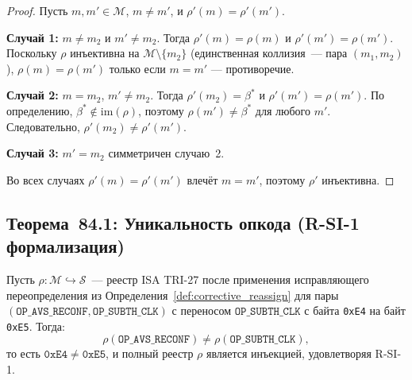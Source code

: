 \begin{proof}
Пусть $m, m' \in \mathcal{M}$, $m \neq m'$, и $\rho'(m) = \rho'(m')$.

\medskip
\noindent\textbf{Случай 1:} $m \neq m_2$ и $m' \neq m_2$.
Тогда $\rho'(m) = \rho(m)$ и $\rho'(m') = \rho(m')$.
Поскольку $\rho$ инъективна на $\mathcal{M} \setminus \{m_2\}$
(единственная коллизия~— пара $(m_1, m_2)$),
$\rho(m) = \rho(m')$ только если $m = m'$ — противоречие.

\medskip
\noindent\textbf{Случай 2:} $m = m_2$, $m' \neq m_2$.
Тогда $\rho'(m_2) = \beta^*$ и $\rho'(m') = \rho(m')$.
По определению, $\beta^* \notin \mathrm{im}(\rho)$,
поэтому $\rho(m') \neq \beta^*$ для любого $m'$.
Следовательно, $\rho'(m_2) \neq \rho'(m')$.

\medskip
\noindent\textbf{Случай 3:} $m' = m_2$ симметричен случаю~2.

\medskip
Во всех случаях $\rho'(m) = \rho'(m')$ влечёт $m = m'$,
поэтому $\rho'$ инъективна.
\end{proof}

\subsection{Теорема~84.1: Уникальность опкода (R-SI-1 формализация)}


\begin{theorem}
\label{thm:opcode_uniqueness}
Пусть $\rho : \mathcal{M} \hookrightarrow \mathcal{S}$~— реестр ISA TRI-27
после применения исправляющего переопределения из
Определения~\ref{def:corrective_reassign} для пары
$(\mathtt{OP\_AVS\_RECONF}, \mathtt{OP\_SUBTH\_CLK})$
с переносом $\mathtt{OP\_SUBTH\_CLK}$ с байта \texttt{0xE4}
на байт \texttt{0xE5}.  Тогда:
\[
  \rho(\mathtt{OP\_AVS\_RECONF}) \neq \rho(\mathtt{OP\_SUBTH\_CLK}),
\]
то есть $\mathtt{0xE4} \neq \mathtt{0xE5}$,
и полный реестр $\rho$ является инъекцией, удовлетворяя R-SI-1.
\end{theorem}

